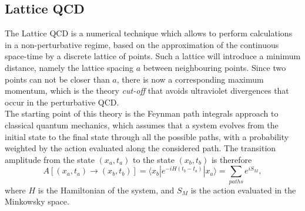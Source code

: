 \documentclass[b5paper,10pt,twoside,oldstyle,classica]{toptesi}
\begin{document}
\subsection{Lattice QCD}
The Lattice QCD is a numerical technique which allows to perform calculations in a non-perturbative regime, based on the approximation of the continuous space-time by a discrete lattice of points. Such a lattice will introduce a minimum distance, namely the lattice spacing $a$ between neighbouring points. Since two points can not be closer than $a$, there is now a corresponding maximum momentum, which is the theory \textit{cut-off} that avoids ultraviolet divergences that occur in the perturbative QCD.\\
The starting point of this theory is the Feynman path integrals approach to classical quantum mechanics, which assumes that a system evolves from the initial state to the final state through all the possible paths, with a probability weighted by the action evaluated along the considered path.
The transition amplitude from the state $(x_a, t_a)$ to the state $(x_b, t_b)$ is therefore
\begin{equation}
 A[(x_a,t_a) \rightarrow (x_b,t_b)] = \langle x_b | e^{-iH(t_b-t_a)} | x_a \rangle = \sum_{paths} e^{iS_M},
\end{equation}
where $H$ is the Hamiltonian of the system, and $S_M$ is the action evaluated in the Minkowsky space.
\end{document}
